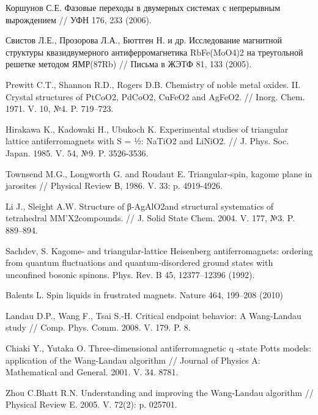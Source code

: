 \begin{thebibliography}{111}

Коршунов С.Е. Фазовые переходы в двумерных системах с непрерывным вырождением // УФН 176, 233 (2006).

Свистов Л.Е., Прозорова Л.А., Бюттген Н. и др. Исследование магнитной структуры квазидвумерного антиферромагнетика RbFe(MoO4)2 на треугольной решетке методом ЯМР(87Rb) // Письма в ЖЭТФ 81, 133 (2005).

Prewitt C.T., Shannon R.D., Rogers D.B. Chemistry of noble metal oxides. II. Crystal structures of PtCoO2, PdCoO2, CuFeO2 and AgFeO2. // Inorg. Chem. 1971. V. 10, №4. P. 719--723.

Hirakawa K., Kadowaki H., Ubukoch K. Experimental studies of triangular lattice antiferromagnets with S = ½: NaTiO2 and LiNiO2. // J. Phys. Soc. Japan. 1985. V. 54, №9. P. 3526-3536.

Townsend M.G., Longworth G. and Roudaut E. Triangular-spin, kagome plane in jarosites // Physical Review В, 1986. V. 33: p. 4919-4926.

Li J., Sleight A.W. Structure of β-AgAlO2and structural systematics of tetrahedral MM’X2compounds. // J. Solid State Chem. 2004.  V. 177, №3. P. 889--894.

Sachdev, S. Kagome- and triangular-lattice Heisenberg antiferromagnets: ordering from quantum fluctuations and quantum-disordered ground states with unconfined bosonic spinons. Phys. Rev. B 45, 12377--12396 (1992).

Balents L. Spin liquids in frustrated magnets. Nature 464, 199--208 (2010)

Landau D.P., Wang F., Tsai S.-H. Critical endpoint behavior: A Wang-Landau study // Comp. Phys. Comm. 2008. V. 179. P. 8.

Chiaki Y., Yutaka O. Three-dimensional antiferromagnetic q -state Potts models: application of the Wang-Landau algorithm // Journal of Physics A: Mathematical and General. 2001. V. 34. 8781.

Zhou C.Bhatt R.N. Understanding and improving the Wang-Landau algorithm // Physical Review E. 2005. V. 72(2): p. 025701.





\end{thebibliography} 